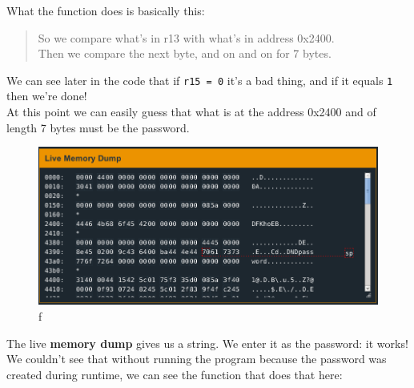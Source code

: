 \documentclass[a4paper,11pt]{article}
\begin{document}
What the function does is basically this:

\begin{Shaded}
\begin{Highlighting}[]
\NormalTok{;}
 
    \NormalTok{)\{}
    \NormalTok{\}}
    \NormalTok{\{}
        \NormalTok{;}
        \NormalTok{;}
    \NormalTok{\}}
\NormalTok{\}}
\NormalTok{\{}
    \NormalTok{;}
    \NormalTok{;}
\NormalTok{\}}
\end{Highlighting}
\end{Shaded}

\begin{quote}
So we compare what's in r13 with what's in address 0x2400.\\Then we
compare the next byte, and on and on for 7 bytes.
\end{quote}

We can see later in the code that if \texttt{r15 = 0} it's a bad thing,
and if it equals \texttt{1} then we're done!\\At this point we can
easily guess that what is at the address 0x2400 and of length 7 bytes
must be the password.

\begin{figure}[htbp]
\centering
\includegraphics{img/1_4.png}
\caption{f}
\end{figure}

The live \textbf{memory dump} gives us a string. We enter it as the
password: it works!\\We couldn't see that without running the program
because the password was created during runtime, we can see the function
that does that here:
\end{document}
